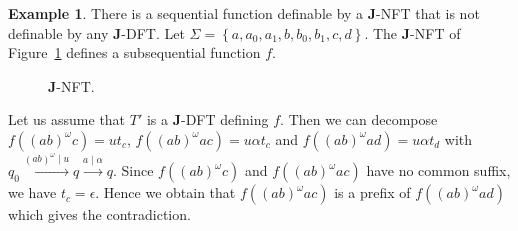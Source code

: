 \documentclass[12pt]{report}
\theoremstyle{definition}
\newtheorem{xmp}{Example}[section]
\theoremstyle{remark}
\begin{document}
\begin{xmp}
There is a sequential function definable by a \textbf J-NFT that is not definable by any \textbf J-DFT.
Let $\Sigma=\left\{a,a_0,a_1,b,b_0,b_1,c,d\right\}$.
The \textbf J-NFT of Figure~\ref{det4} defines a subsequential function $f$.

\begin{figure}[t]
\centering

\caption{\textbf J-NFT.}
\label{det4}
\end{figure}

Let us assume that $T'$ is a \textbf J-DFT defining $f$. Then we can decompose $f((ab)^\omega c)=ut_c$, $f((ab)^\omega ac)=u\alpha t_c$ and $f((ab)^\omega ad)=u\alpha t_d$ with $q_0\xrightarrow{(ab)^\omega\mid u}q\xrightarrow{a\mid \alpha}q$. Since $f((ab)^\omega c)$ and $f((ab)^\omega ac)$ have no common suffix, we have $t_c=\epsilon$. Hence we obtain that $f((ab)^\omega ac)$ is a prefix of $f((ab)^\omega ad)$ which gives the contradiction.
\end{xmp}
\end{document}
